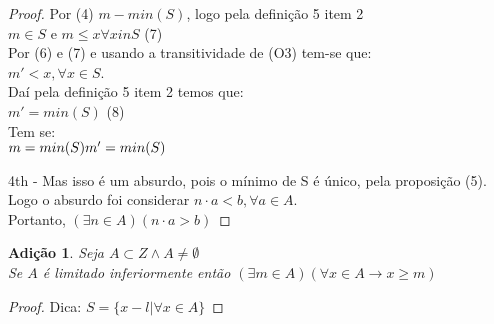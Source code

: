 \documentclass[a4paper,12pt]{article}
\newtheorem{add}{Adição}
\begin{document}
\begin{proof}
  Por (4) $m - min(S)$, logo pela definição 5 item 2\\
  $m \in S$ e $m\leq x \forall x in S$ (7)\\
  Por (6) e (7) e usando a transitividade de (O3) tem-se que:\\
  $m' < x, \forall x \in S$.\\
  Daí pela definição 5 item 2 temos que:\\
  $m' = min(S)$ (8)\\
  Tem se:\\
  $
  m = min(S)\\
  m' = min (S)
  $

  4th - Mas isso é um absurdo, pois o mínimo de S é único, pela proposição (5). Logo o absurdo foi considerar $n \cdot a < b, \forall a \in A$.\\
  Portanto, $(\exists n \in A)(n \cdot a > b)$
\end{proof}


\begin{add} %
  Seja $A \subset Z \wedge A \neq \emptyset$\\
  Se $A$ é limitado inferiormente então $(\exists m \in A)(\forall x \in A \longrightarrow x \geq m)$
\end{add}
\begin{proof}
  Dica: $S = \{x - l | \forall x \in A\}$
\end{proof}




\nocite{*}


\end{document}
